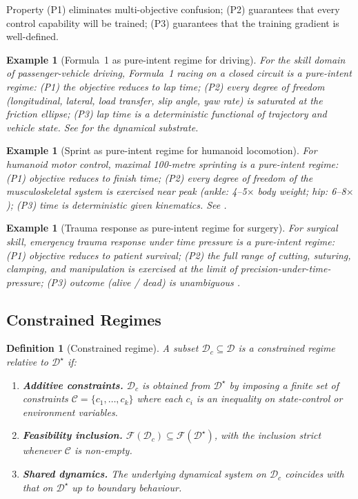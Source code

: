 \documentclass[11pt,twocolumn,a4paper]{article}
\newtheorem{definition}[theorem]{Definition}
\newtheorem{example}[theorem]{Example}
\newcommand{\cF}{\mathcal{F}}
\newcommand{\cD}{\mathcal{D}}
\newcommand{\cC}{\mathcal{C}}
\begin{document}
Property (P1) eliminates multi-objective confusion; (P2) guarantees that every control capability will be trained; (P3) guarantees that the training gradient is well-defined.

\begin{example}[Formula~1 as pure-intent regime for driving]
\label{ex:f1}
For the skill domain of passenger-vehicle driving, Formula~1 racing on a closed circuit is a pure-intent regime: (P1) the objective reduces to lap time; (P2) every degree of freedom (longitudinal, lateral, load transfer, slip angle, yaw rate) is saturated at the friction ellipse; (P3) lap time is a deterministic functional of trajectory and vehicle state. See \cite{milliken1995race} for the dynamical substrate.
\end{example}

\begin{example}[Sprint as pure-intent regime for humanoid locomotion]
\label{ex:bolt}
For humanoid motor control, maximal 100-metre sprinting is a pure-intent regime: (P1) objective reduces to finish time; (P2) every degree of freedom of the musculoskeletal system is exercised near peak (ankle: 4--5$\times$ body weight; hip: 6--8$\times$); (P3) time is deterministic given kinematics. See \cite{weyand2010biological,bolt2013worlds}.
\end{example}

\begin{example}[Trauma response as pure-intent regime for surgery]
For surgical skill, emergency trauma response under time pressure is a pure-intent regime: (P1) objective reduces to patient survival; (P2) the full range of cutting, suturing, clamping, and manipulation is exercised at the limit of precision-under-time-pressure; (P3) outcome (alive / dead) is unambiguous \cite{reiley2011review}.
\end{example}

\subsection{Constrained Regimes}

\begin{definition}[Constrained regime]
\label{def:constrained}
A subset $\cD_c \subseteq \cD$ is a \emph{constrained regime} relative to $\cD^\star$ if:
\begin{enumerate}[leftmargin=*,itemsep=1pt]
\item[(C1)] \textbf{Additive constraints.} $\cD_c$ is obtained from $\cD^\star$ by imposing a finite set of constraints $\cC = \{c_1, \ldots, c_k\}$ where each $c_i$ is an inequality on state-control or environment variables.
\item[(C2)] \textbf{Feasibility inclusion.} $\cF(\cD_c) \subseteq \cF(\cD^\star)$, with the inclusion strict whenever $\cC$ is non-empty.
\item[(C3)] \textbf{Shared dynamics.} The underlying dynamical system on $\cD_c$ coincides with that on $\cD^\star$ up to boundary behaviour.
\end{enumerate}
\end{definition}
\end{document}
